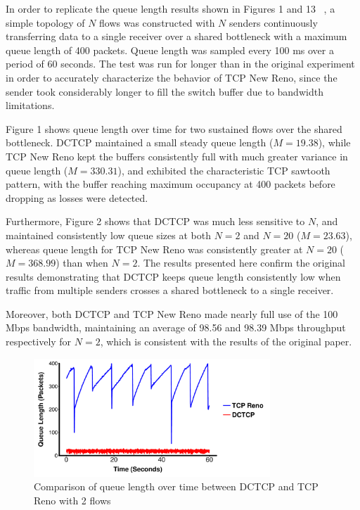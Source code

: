 In order to replicate the queue length results shown in Figures 1 and 13 ~\cite{alizadeh_data_2010}, a simple topology of $N$ flows was constructed with $N$ senders continuously transferring data to a single receiver over a shared bottleneck with a maximum queue length of 400 packets. Queue length was sampled every 100 ms over a period of 60 seconds. The test was run for longer than in the original experiment in order to accurately characterize the behavior of TCP New Reno, since the sender took considerably longer to fill the switch buffer due to bandwidth limitations. 

Figure 1 shows queue length over time for two sustained flows over the shared bottleneck. DCTCP maintained a small steady queue length ($M = 19.38$), while TCP New Reno kept the buffers consistently full with much greater variance in queue length ($M = 330.31$), and exhibited the characteristic TCP sawtooth pattern, with the buffer reaching maximum occupancy at 400 packets before dropping as losses were detected. 

Furthermore, Figure 2 shows that DCTCP was much less sensitive to $N$, and maintained consistently low queue sizes at both $N = 2$ and $N = 20$ ($M = 23.63$), whereas queue length for TCP New Reno was consistently greater at $N = 20$ ($M = 368.99$) than when $N = 2$. The results presented here confirm the original results demonstrating that DCTCP keeps queue length consistently low when traffic from multiple senders crosses a shared bottleneck to a single receiver.  

Moreover, both DCTCP and TCP New Reno made nearly full use of the 100 Mbps bandwidth, maintaining an average of 98.56 and 98.39 Mbps throughput respectively for $N = 2$, which is consistent with the results of the original paper. 

\begin{figure}
\includegraphics[height=1.75in,width=3.5in]{queue_2_flows}
\caption{Comparison of queue length over time between DCTCP and TCP Reno with 2 flows}
\end{figure}

